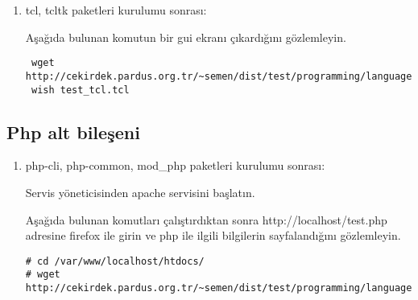 \documentclass[a4paper,10pt]{article}
\begin{document}
\begin{enumerate}
 \item tcl, tcltk paketleri kurulumu sonrası:

Aşağıda bulunan komutun bir gui ekranı çıkardığını gözlemleyin.
\begin{verbatim}
 wget http://cekirdek.pardus.org.tr/~semen/dist/test/programming/language/test_tcl.tcl
 wish test_tcl.tcl
\end{verbatim}


\end{enumerate}

\subsection{Php alt bileşeni}
\begin{enumerate}


 \item php-cli, php-common, mod\_php paketleri kurulumu sonrası:

Servis yöneticisinden apache servisini başlatın.

Aşağıda bulunan komutları çalıştırdıktan sonra http://localhost/test.php adresine firefox ile girin ve php ile ilgili bilgilerin sayfalandığını gözlemleyin.

\begin{verbatim}
# cd /var/www/localhost/htdocs/
# wget http://cekirdek.pardus.org.tr/~semen/dist/test/programming/language/php/test.php 
\end{verbatim}

\end{enumerate}
\end{document}
